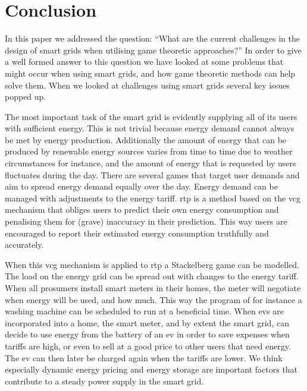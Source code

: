 \section{Conclusion}\label{conclusion}
\acresetall
In this paper we addressed the question: ``What are the current challenges in the design of smart grids when utilising game theoretic approaches?'' In order to give a well formed answer to this question we have looked at some problems that might occur when using smart grids, and how game theoretic methods can help solve them. When we looked at challenges using smart grids several key issues popped up. 

The most important task of the smart grid is evidently supplying all of its users with sufficient energy. This is not trivial because energy demand cannot always be met by energy production. Additionally the amount of energy that can be produced by renewable energy sources varies from time to time due to weather circumstances for instance, and the amount of energy that is requested by users fluctuates during the day. There are several games that target user demands and aim to spread energy demand equally over the day. Energy demand can be managed with adjustments to the energy tariff. \ac{rtp} is a method based on the \ac{vcg} mechanism that obliges users to predict their own energy consumption and penalising them for (grave) inaccuracy in their prediction. This way users are encouraged to report their estimated energy consumption truthfully and accurately. 

When this \ac{vcg} mechanism is applied to \ac{rtp} a Stackelberg game can be modelled. The load on the energy grid can be spread out with changes to the energy tariff. When all prosumers install smart meters in their homes, the meter will negotiate when energy will be used, and how much. This way the program of for instance a washing machine can be scheduled to run at a beneficial time. When \acp{ev} are incorporated into a home, the smart meter, and by extent the smart grid, can decide to use energy from the battery of an \ac{ev} in order to save expenses when tariffs are high, or even to sell at a good price to other users that need energy. The \ac{ev} can then later be charged again when the tariffs are lower. 
We think especially dynamic energy pricing and energy storage are important factors that contribute to a steady power supply in the smart grid.

